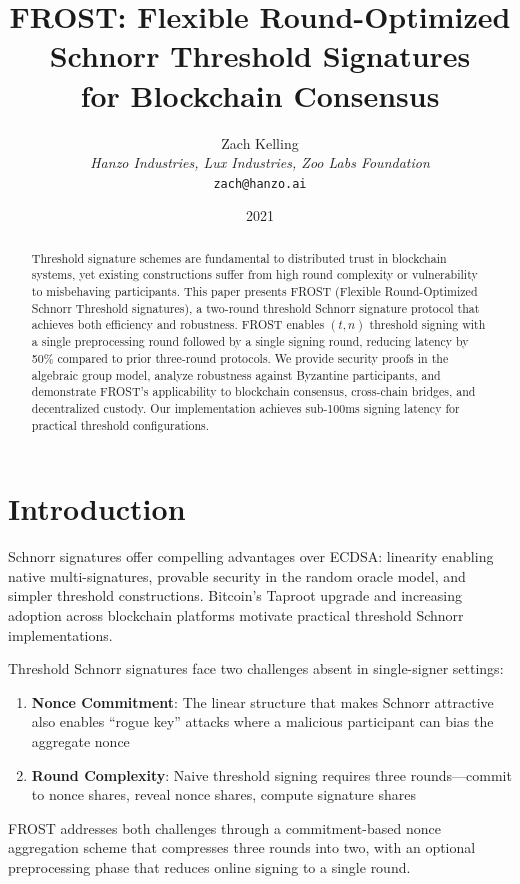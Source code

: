 \documentclass[11pt,a4paper]{article}
\title{FROST: Flexible Round-Optimized Schnorr Threshold Signatures\\for Blockchain Consensus}
\author{Zach Kelling\\
\textit{Hanzo Industries, Lux Industries, Zoo Labs Foundation}\\
\texttt{zach@hanzo.ai}}
\date{2021}
\begin{document}
\maketitle

\begin{abstract}
Threshold signature schemes are fundamental to distributed trust in blockchain systems, yet existing constructions suffer from high round complexity or vulnerability to misbehaving participants. This paper presents FROST (Flexible Round-Optimized Schnorr Threshold signatures), a two-round threshold Schnorr signature protocol that achieves both efficiency and robustness. FROST enables $(t,n)$ threshold signing with a single preprocessing round followed by a single signing round, reducing latency by 50\% compared to prior three-round protocols. We provide security proofs in the algebraic group model, analyze robustness against Byzantine participants, and demonstrate FROST's applicability to blockchain consensus, cross-chain bridges, and decentralized custody. Our implementation achieves sub-100ms signing latency for practical threshold configurations.
\end{abstract}

\section{Introduction}

Schnorr signatures \cite{schnorr1991} offer compelling advantages over ECDSA: linearity enabling native multi-signatures, provable security in the random oracle model, and simpler threshold constructions. Bitcoin's Taproot upgrade and increasing adoption across blockchain platforms motivate practical threshold Schnorr implementations.

Threshold Schnorr signatures face two challenges absent in single-signer settings:
\begin{enumerate}
    \item \textbf{Nonce Commitment}: The linear structure that makes Schnorr attractive also enables ``rogue key'' attacks where a malicious participant can bias the aggregate nonce
    \item \textbf{Round Complexity}: Naive threshold signing requires three rounds---commit to nonce shares, reveal nonce shares, compute signature shares
\end{enumerate}

FROST addresses both challenges through a commitment-based nonce aggregation scheme that compresses three rounds into two, with an optional preprocessing phase that reduces online signing to a single round.
\end{document}
